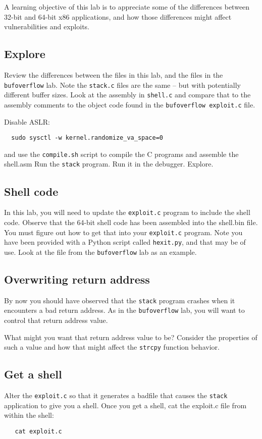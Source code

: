 A learning objective of this lab is to appreciate some of the differences between 32-bit and 64-bit x86 applications,
and how those differences might affect vulnerabilities and exploits.


\subsection{Explore}
Review the differences between the files in this lab, and the files in the {\tt bufoverflow} lab.  Note the {\tt stack.c}
files are the same -- but with potentially different buffer sizes.  Look at the assembly in {\tt shell.c} and compare that
to the assembly comments to the object code found in the {\tt bufoverflow exploit.c} file.

Disable ASLR:
\begin{verbatim}
  sudo sysctl -w kernel.randomize_va_space=0
\end{verbatim}
\noindent and use the {\tt compile.sh} script to compile the C programs and assemble the shell.asm
Run the {\tt stack} program.  Run it in the debugger.  Explore.

\subsection{Shell code}
In this lab, you will need to update the {\tt exploit.c} program to include the shell code.  Observe that the 64-bit
shell code has been assembled into the shell.bin file.  You must figure out how to get that into your {\tt exploit.c}
program.  Note you have been provided with a Python script called {\tt hexit.py}, and that may be of use.  Look at the
file from the {\tt bufoverflow} lab as an example.

\subsection{Overwriting return address}
By now you should have observed that the {\tt stack} program crashes when it encounters a bad return address.
As in the {\tt bufoverflow} lab, you will want to control that return address value.

What might you want that return address value to be?  Consider the properties of such a value and how that might
affect the {\tt strcpy} function behavior.

\subsection{Get a shell}
Alter the {\tt exploit.c} so that it generates a badfile that causes the {\tt stack} application to give you  a shell.
Once you get a shell, cat the exploit.c file from within the shell:
\begin{verbatim}
   cat exploit.c
\end{verbatim}

